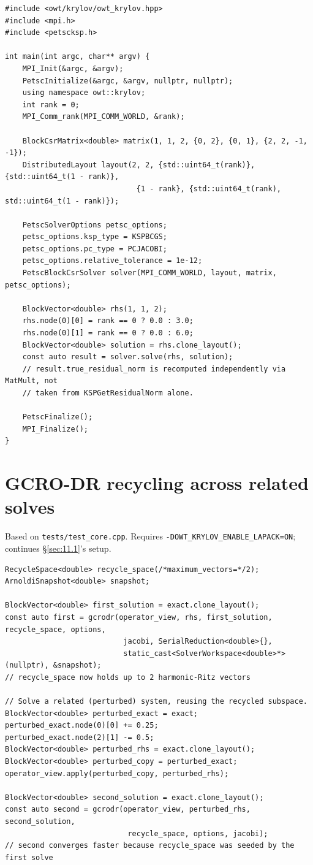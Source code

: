 \documentclass[11pt,a4paper]{report}
\newcommand{\secref}[1]{\S\ref{#1}}
\begin{document}
\begin{lstlisting}
#include <owt/krylov/owt_krylov.hpp>
#include <mpi.h>
#include <petscksp.h>

int main(int argc, char** argv) {
    MPI_Init(&argc, &argv);
    PetscInitialize(&argc, &argv, nullptr, nullptr);
    using namespace owt::krylov;
    int rank = 0;
    MPI_Comm_rank(MPI_COMM_WORLD, &rank);

    BlockCsrMatrix<double> matrix(1, 1, 2, {0, 2}, {0, 1}, {2, 2, -1, -1});
    DistributedLayout layout(2, 2, {std::uint64_t(rank)}, {std::uint64_t(1 - rank)},
                              {1 - rank}, {std::uint64_t(rank), std::uint64_t(1 - rank)});

    PetscSolverOptions petsc_options;
    petsc_options.ksp_type = KSPBCGS;
    petsc_options.pc_type = PCJACOBI;
    petsc_options.relative_tolerance = 1e-12;
    PetscBlockCsrSolver solver(MPI_COMM_WORLD, layout, matrix, petsc_options);

    BlockVector<double> rhs(1, 1, 2);
    rhs.node(0)[0] = rank == 0 ? 0.0 : 3.0;
    rhs.node(0)[1] = rank == 0 ? 0.0 : 6.0;
    BlockVector<double> solution = rhs.clone_layout();
    const auto result = solver.solve(rhs, solution);
    // result.true_residual_norm is recomputed independently via MatMult, not
    // taken from KSPGetResidualNorm alone.

    PetscFinalize();
    MPI_Finalize();
}
\end{lstlisting}

\section{GCRO-DR recycling across related solves}
\label{sec:11.5}

Based on \texttt{tests/test\_core.cpp}. Requires
\lstinline!-DOWT_KRYLOV_ENABLE_LAPACK=ON!; continues \secref{sec:11.1}'s
setup.

\begin{lstlisting}
RecycleSpace<double> recycle_space(/*maximum_vectors=*/2);
ArnoldiSnapshot<double> snapshot;

BlockVector<double> first_solution = exact.clone_layout();
const auto first = gcrodr(operator_view, rhs, first_solution, recycle_space, options,
                           jacobi, SerialReduction<double>{},
                           static_cast<SolverWorkspace<double>*>(nullptr), &snapshot);
// recycle_space now holds up to 2 harmonic-Ritz vectors

// Solve a related (perturbed) system, reusing the recycled subspace.
BlockVector<double> perturbed_exact = exact;
perturbed_exact.node(0)[0] += 0.25;
perturbed_exact.node(2)[1] -= 0.5;
BlockVector<double> perturbed_rhs = exact.clone_layout();
BlockVector<double> perturbed_copy = perturbed_exact;
operator_view.apply(perturbed_copy, perturbed_rhs);

BlockVector<double> second_solution = exact.clone_layout();
const auto second = gcrodr(operator_view, perturbed_rhs, second_solution,
                            recycle_space, options, jacobi);
// second converges faster because recycle_space was seeded by the first solve
\end{lstlisting}
\end{document}
